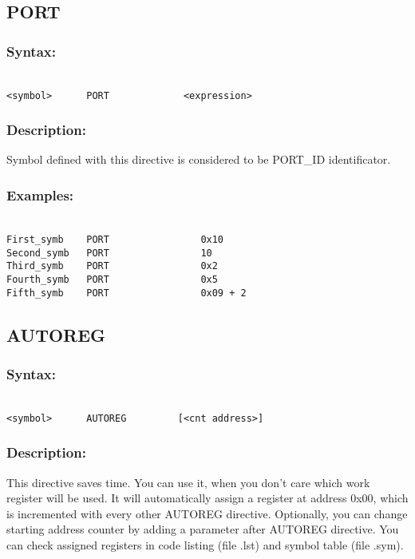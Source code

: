     \subsection{PORT}
        \subsubsection{Syntax:}
            {
                ~\\
                \usecodefont
            \verb'<symbol>      PORT             <expression>'
            }
        \subsubsection{Description:}
        Symbol defined with this directive is considered to be PORT\_ID identificator.

        \subsubsection{Examples:}
            {
                ~\\
                \usecodefont
                \verb'First_symb    PORT                0x10    '\\
                \verb'Second_symb   PORT                10      '\\
                \verb'Third_symb    PORT                0x2     '\\
                \verb'Fourth_symb   PORT                0x5     '\\
                \verb'Fifth_symb    PORT                0x09 + 2'\\
            }
    \subsection{AUTOREG}
        \subsubsection{Syntax:}
            {
                ~\\
                \usecodefont
            \verb'<symbol>      AUTOREG         [<cnt address>]'
            }
        \subsubsection{Description:}
        This directive saves time. You can use it, when you don't care which work register will be used. It will automatically assign a register
        at address 0x00, which is incremented with every other AUTOREG directive. Optionally, you can change starting address counter by adding a parameter
        after AUTOREG directive. You can check assigned registers in code listing (file .lst) and symbol table (file .sym).

